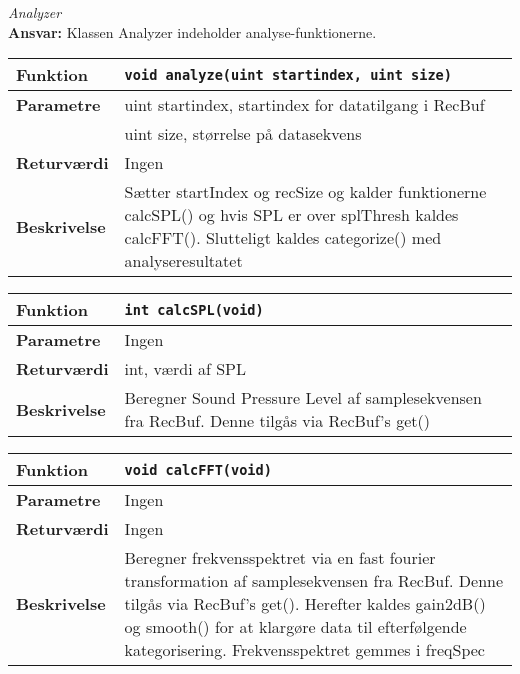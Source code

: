 \textit{Analyzer} \\
\textbf{Ansvar:} Klassen Analyzer indeholder analyse-funktionerne.

\begin{center}
    \begin{tabular}{ | l | p{} |}
    \hline
    \textbf{Funktion}	& \verb+void analyze(uint startindex, uint size) +			\\ \hline
    \textbf{Parametre} 	& uint startindex, startindex for datatilgang i RecBuf		\\ 
    					& uint size, størrelse på datasekvens						\\ \hline
    \textbf{Returværdi}	& Ingen 													\\ \hline
    \textbf{Beskrivelse}& Sætter startIndex og recSize og kalder funktionerne calcSPL() og hvis SPL er over splThresh kaldes calcFFT(). Slutteligt kaldes categorize() med analyseresultatet	\\ \hline
    \end{tabular}
\end{center} 

\begin{center}
    \begin{tabular}{ | l | p{} |}
    \hline
    \textbf{Funktion}	& \verb+int calcSPL(void) +						\\ \hline
    \textbf{Parametre} 	& Ingen		\\ \hline
    \textbf{Returværdi}	& int, værdi af SPL 								\\ \hline
    \textbf{Beskrivelse}& Beregner Sound Pressure Level af samplesekvensen fra RecBuf. Denne tilgås via RecBuf's get()		\\ \hline
    \end{tabular}
\end{center} 

\begin{center}
    \begin{tabular}{ | l | p{} |}
    \hline
    \textbf{Funktion}	& \verb+void calcFFT(void) +						\\ \hline
    \textbf{Parametre} 	& Ingen		\\ \hline
    \textbf{Returværdi}	& Ingen							\\ \hline
    \textbf{Beskrivelse}& Beregner frekvensspektret via en fast fourier transformation af samplesekvensen fra RecBuf. Denne tilgås via RecBuf's get(). Herefter kaldes gain2dB() og smooth() for at klargøre data til efterfølgende kategorisering. Frekvensspektret gemmes i freqSpec\\ \hline
    \end{tabular}
\end{center}

